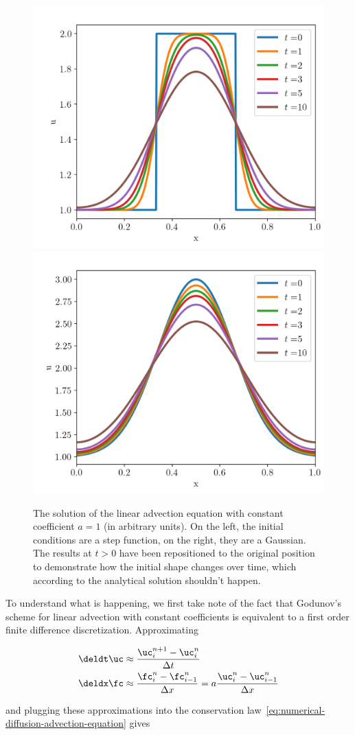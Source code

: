 \begin{figure}
    \centering
    \includegraphics[width=.5\textwidth]{
    ./figures/FV/advection_pwconst/advection-1D-step.png}%
    \includegraphics[width=.5\textwidth]{
    ./figures/FV/advection_pwconst/advection-1D-gaussian.png}%
    \caption[Linear advection with Godunov's method]{
The solution of the linear advection equation with constant coefficient $a = 1$ (in arbitrary
units). On the left, the initial conditions are a step function, on the right, they are a
Gaussian. The results at $t > 0$ have been repositioned to the original position to demonstrate
how the initial shape changes over time, which according to the analytical solution shouldn't
happen.
    }%
    \label{fig:linear-advection-godunov}
\end{figure}


To understand what is happening, we first take note of the fact that Godunov's scheme for linear
advection with constant coefficients is equivalent to a first order finite difference
discretization. Approximating

\begin{align}
    \deldt \uc &\approx \frac{\uc_i^{n+1} - \uc_i^n}{\Delta t} \\
    \deldx \fc &\approx \frac{\fc^{n}_{i} - \fc_{i-1}^n}{\Delta x}
        = a\frac{\uc^{n}_{i} - \uc_{i-1}^n}{\Delta x}
\end{align}

and plugging these approximations into the conservation
law~\ref{eq:numerical-diffusion-advection-equation} gives

